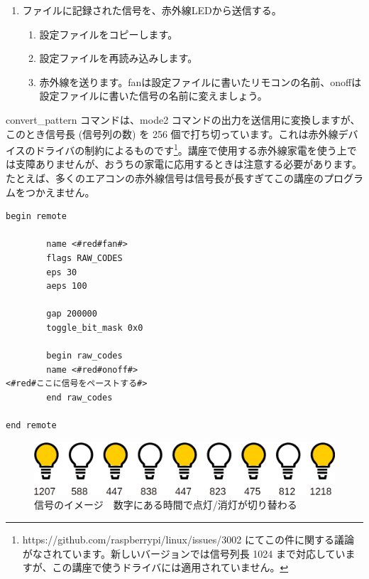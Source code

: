 \begin{tcolorbox}[title=\useOmetoi]
\begin{enumerate}
\begin{enumerate}[1]
 \end{enumerate}
\item ファイルに記録された信号を、赤外線LEDから送信する。
 \begin{enumerate}[1]
  \item 設定ファイルをコピーします。 \\ 
  \item 設定ファイルを再読み込みします。\\ 
  \item 赤外線を送ります。fanは設定ファイルに書いたリモコンの名前、onoffは設定ファイルに書いた信号の名前に変えましょう。\\ 
 \end{enumerate}
\end{enumerate}
\end{tcolorbox}

convert\_pattern コマンドは、mode2 コマンドの出力を送信用に変換しますが、このとき信号長 (信号列の数) を 256 個で打ち切っています。これは赤外線デバイスのドライバの制約によるものです\footnote{https://github.com/raspberrypi/linux/issues/3002 にてこの件に関する議論がなされています。新しいバージョンでは信号列長 1024 まで対応していますが、この講座で使うドライバには適用されていません。}。講座で使用する赤外線家電を使う上では支障ありませんが、おうちの家電に応用するときは注意する必要があります。たとえば、多くのエアコンの赤外線信号は信号長が長すぎてこの講座のプログラムをつかえません。\\
\begin{lstlisting}[caption=template.lircd.conf,label=template.lircd.conf]
begin remote

        name <#red#fan#>
        flags RAW_CODES
        eps 30
        aeps 100

        gap 200000
        toggle_bit_mask 0x0

        begin raw_codes
        name <#red#onoff#>
<#red#ここに信号をペーストする#>
        end raw_codes

end remote
\end{lstlisting}

\begin{figure}[H]
    \centering
 \includegraphics[width=\columnwidth]{images/chap05/text05-img042.png}
    \caption{信号のイメージ　数字にある時間で点灯/消灯が切り替わる}
\end{figure}